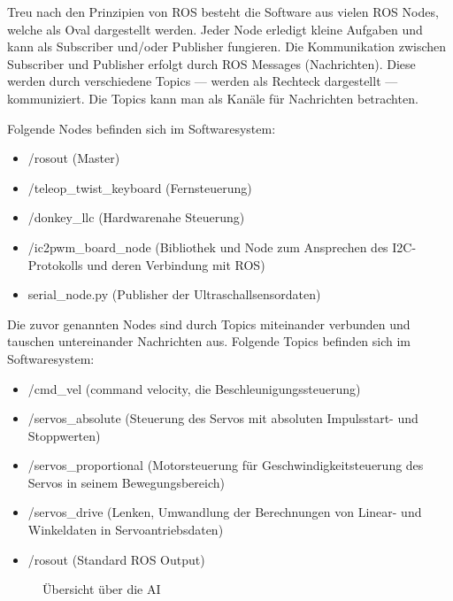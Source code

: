\documentclass[conference]{IEEEtran}
\begin{document}
	Treu nach den Prinzipien von ROS besteht die Software aus vielen ROS Nodes, welche als Oval dargestellt werden. 
	Jeder Node erledigt kleine Aufgaben und kann als Subscriber und/oder Publisher fungieren.
	Die Kommunikation zwischen Subscriber und Publisher erfolgt durch ROS Messages (Nachrichten).
	Diese werden durch verschiedene Topics — werden als Rechteck dargestellt — kommuniziert.
	Die Topics kann man als Kanäle für Nachrichten betrachten.
	
	Folgende Nodes befinden sich im Softwaresystem:
	\begin{itemize}
		\item /rosout (Master)
		\item /teleop\_twist\_keyboard (Fernsteuerung)
		\item /donkey\_llc (Hardwarenahe Steuerung)
		\item /ic2pwm\_board\_node (Bibliothek und Node zum Ansprechen des I2C-Protokolls und deren Verbindung mit ROS)
		\item serial\_node.py (Publisher der Ultraschallsensordaten)
	\end{itemize}
	
	Die zuvor genannten Nodes sind durch Topics miteinander verbunden und tauschen untereinander Nachrichten aus.
	Folgende Topics befinden sich im Softwaresystem:
	\begin{itemize}
		\item /cmd\_vel (command velocity, die Beschleunigungssteuerung)
		\item /servos\_absolute (Steuerung des Servos mit absoluten Impulsstart- und Stoppwerten)
		\item /servos\_proportional (Motorsteuerung für Geschwindigkeitsteuerung des Servos in seinem Bewegungsbereich)
		\item /servos\_drive (Lenken, Umwandlung der Berechnungen von Linear- und Winkeldaten in Servoantriebsdaten)
		\item /rosout (Standard ROS Output)
	\end{itemize}


	\begin{figure}[!ht] 
		\centering
		\def\svgwidth{11cm}
		
		\caption{Übersicht über die AI}
		\label{AI-Only}
	\end{figure}
\end{document}
